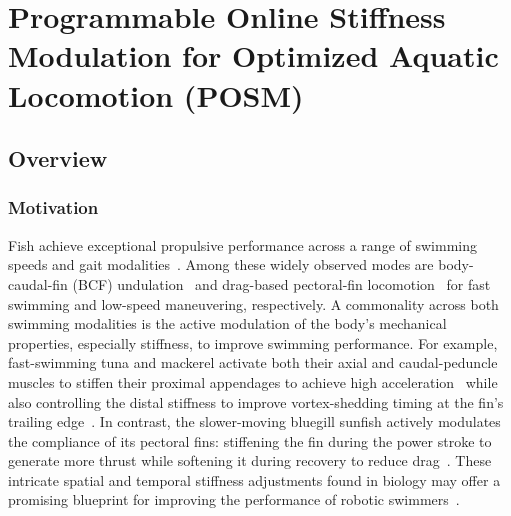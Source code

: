 
\chapter{Programmable Online Stiffness Modulation for Optimized Aquatic Locomotion (POSM)}
\label{chapPOSM}

\section{Overview}
\label{sec:POSM_overview}

\subsection{Motivation}

Fish achieve exceptional propulsive performance across a range of swimming speeds and gait modalities~\cite{lucas_bending_2014, daniel_flexible_2002, dewey_scaling_2013}. Among these widely observed modes are body-caudal-fin (BCF) undulation~\cite{cromie_lear_biomechanical_2020} and drag-based pectoral-fin locomotion~\cite{boudrias_are_2002} for fast swimming and low-speed maneuvering, respectively. A commonality across both swimming modalities is the active modulation of the body's mechanical properties, especially stiffness, to improve swimming performance. For example, fast-swimming tuna and mackerel activate both their axial and caudal-peduncle muscles to stiffen their proximal appendages to achieve high acceleration~\cite{cromie_lear_biomechanical_2020,boudrias_are_2002} while also controlling the distal stiffness to improve vortex-shedding timing at the fin's trailing edge~\cite{hemmati_effects_2019, nedic_vortex_2015}. In contrast, the slower-moving bluegill sunfish actively modulates the compliance of its pectoral fins: stiffening the fin during the power stroke to generate more thrust while softening it during recovery to reduce drag~\cite{floryan_distributed_2020,long_stiffness_1992}. These intricate spatial and temporal stiffness adjustments found in biology may offer a promising blueprint for improving the performance of robotic swimmers~\cite{domenici_kinematics_1997}.

